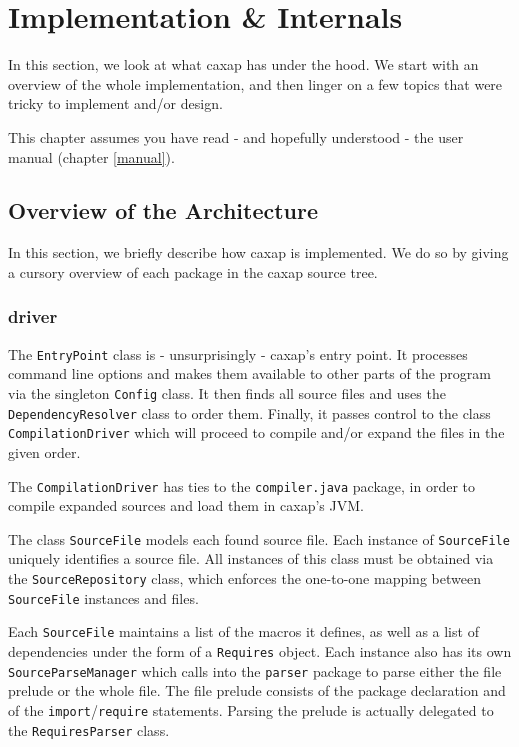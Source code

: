 \chapter{Implementation \& Internals}

In this section, we look at what caxap has under the hood. We start with an
overview of the whole implementation, and then linger on a few topics that were
tricky to implement and/or design.

This chapter assumes you have read - and hopefully understood - the user manual
(chapter \ref{manual}).

\section{Overview of the Architecture}

In this section, we briefly describe how caxap is implemented. We do so by
giving a cursory overview of each package in the caxap source tree.

\subsection{driver}

The \texttt{EntryPoint} class is - unsurprisingly - caxap's entry point. It
processes command line options and makes them available to other parts of the
program via the singleton \texttt{Config} class. It then finds all source files
and uses the \texttt{DependencyResolver} class to order them. Finally, it passes
control to the class \texttt{CompilationDriver} which will proceed to compile
and/or expand the files in the given order.

The \texttt{CompilationDriver} has ties to the \texttt{compiler.java} package,
in order to compile expanded sources and load them in caxap's JVM.

The class \texttt{SourceFile} models each found source file. Each instance of
\texttt{SourceFile} uniquely identifies a source file. All instances of this
class must be obtained via the \texttt{SourceRepository} class, which enforces
the one-to-one mapping between \texttt{SourceFile} instances and files.

Each \texttt{SourceFile} maintains a list of the macros it defines, as well as a
list of dependencies under the form of a \texttt{Requires} object. Each instance
also has its own \texttt{SourceParseManager} which calls into the
\texttt{parser} package to parse either the file prelude or the whole file. The
file prelude consists of the package declaration and of the
\texttt{import}/\texttt{require} statements. Parsing the prelude is actually
delegated to the \texttt{RequiresParser} class.

